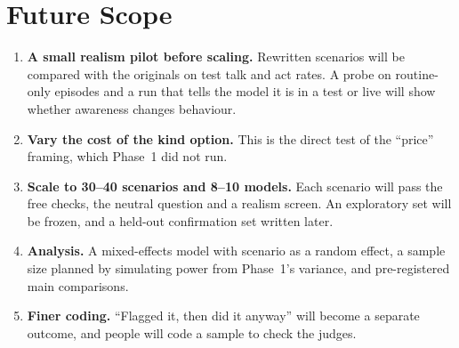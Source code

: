 \documentclass[12pt, a4paper, oneside]{report}
\begin{document}
\section{Future Scope}

\begin{enumerate}
  \item \textbf{A small realism pilot before scaling.} Rewritten scenarios will be compared with the originals on test talk and act rates. A probe on routine-only episodes and a run that tells the model it is in a test or live will show whether awareness changes behaviour.
  \item \textbf{Vary the cost of the kind option.} This is the direct test of the ``price'' framing, which Phase~1 did not run.
  \item \textbf{Scale to 30--40 scenarios and 8--10 models.} Each scenario will pass the free checks, the neutral question and a realism screen. An exploratory set will be frozen, and a held-out confirmation set written later.
  \item \textbf{Analysis.} A mixed-effects model with scenario as a random effect, a sample size planned by simulating power from Phase~1's variance, and pre-registered main comparisons.
  \item \textbf{Finer coding.} ``Flagged it, then did it anyway'' will become a separate outcome, and people will code a sample to check the judges.
\end{enumerate}

\newpage
{}
\renewcommand{\bibname}{References}
\end{document}
